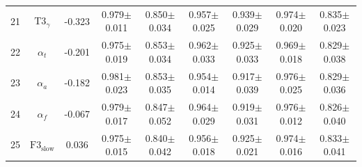 \documentclass[pdflatex,sn-mathphys]{sn-jnl}%
\theoremstyle{thmstyleone}%
\theoremstyle{thmstyletwo}%
\theoremstyle{thmstylethree}%
\begin{document}
\begin{appendices}
\begin{table}[h!]
{\begin{tabular}{r|cccccccc}
  21 &          $\text{T3}_{\gamma}$ & -0.323 &          0.979$\pm$0.011 &          0.850$\pm$0.034 &          0.957$\pm$0.025 &          0.939$\pm$0.029 &          0.974$\pm$0.020 &          0.835$\pm$0.023 \\
  22 &                  $\alpha_{t}$ & -0.201 &          0.975$\pm$0.019 &          0.853$\pm$0.034 &          0.962$\pm$0.033 &          0.925$\pm$0.033 &          0.969$\pm$0.018 &          0.829$\pm$0.038 \\
  23 &                  $\alpha_{a}$ & -0.182 &          0.981$\pm$0.023 &          0.853$\pm$0.035 &          0.954$\pm$0.014 &          0.917$\pm$0.039 &          0.976$\pm$0.025 &          0.829$\pm$0.036 \\
  24 &                  $\alpha_{f}$ & -0.067 &          0.979$\pm$0.017 &          0.847$\pm$0.052 &          0.964$\pm$0.029 &          0.919$\pm$0.031 &          0.976$\pm$0.012 &          0.826$\pm$0.040 \\
  25 &       $\text{F3}_\text{slow}$ &  0.036 &          0.975$\pm$0.015 &          0.840$\pm$0.042 &          0.956$\pm$0.018 &          0.925$\pm$0.021 &          0.974$\pm$0.016 &          0.833$\pm$0.041 \\
\hline
\end{tabular}
}
\end{table}



\end{appendices}
\end{document}
